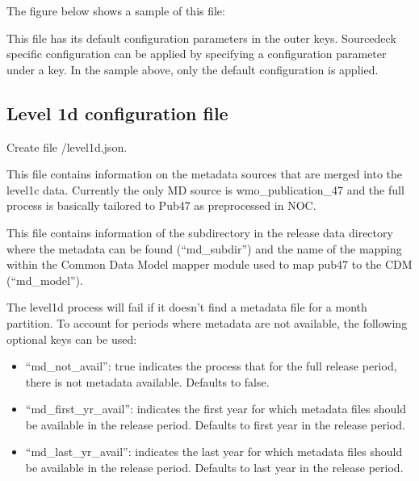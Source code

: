 \documentclass[letterpaper,10pt,english]{sphinxmanual}
\begin{document}
The figure below shows a sample of this file:

\begin{sphinxVerbatim}[commandchars=\\\{\}]
   
   
   
\end{sphinxVerbatim}

This file has its default configuration parameters in the outer keys.
Source\sphinxhyphen{}deck specific configuration can be applied by specifying a configuration
parameter under a  key. In the sample above, only the default
configuration is applied.


\subsection{Level 1d configuration file}
\label{\detokenize{index:level-1d-configuration-file}}\label{\detokenize{index:level1d-config-file}}
Create file /level1d.json.

This file contains information
on the metadata sources that are merged into the level1c data. Currently the
only MD source is wmo\_publication\_47 and the full process is basically tailored
to Pub47 as pre\sphinxhyphen{}processed in NOC.

This file contains information of the subdirectory in the release data directory
where the metadata can be found (“md\_subdir”) and the name of the mapping within the
Common Data Model mapper module used to map pub47 to the CDM (“md\_model”).

The level1d process will fail if it doesn’t find a metadata file for a month
partition. To account for periods where metadata are not available, the
following optional keys can be used:
\begin{itemize}
\item {}
“md\_not\_avail”: true indicates the process that for the full release period,
there is not metadata available. Defaults to false.

\item {}
“md\_first\_yr\_avail”: indicates the first year for which metadata files should
be available in the release period. Defaults to first year in the release
period.

\item {}
“md\_last\_yr\_avail”: indicates the last year for which metadata files should be
available in the release period. Defaults to last year in the release
period.

\end{itemize}
\end{document}
